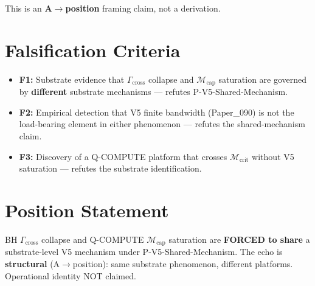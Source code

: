\documentclass[11pt,a4paper]{article}
\begin{document}
This is an \textbf{A$\to$position} framing claim, not a derivation.

\section{Falsification Criteria}

\begin{itemize}[noitemsep]
\item \textbf{F1:} Substrate evidence that $\Gamma_\mathrm{cross}$ collapse and $\mathcal{M}_\mathrm{cap}$ saturation are governed by \textbf{different} substrate mechanisms --- refutes P-V5-Shared-Mechanism.
\item \textbf{F2:} Empirical detection that V5 finite bandwidth (Paper\_090) is not the load-bearing element in either phenomenon --- refutes the shared-mechanism claim.
\item \textbf{F3:} Discovery of a Q-COMPUTE platform that crosses $\mathcal{M}_\mathrm{crit}$ without V5 saturation --- refutes the substrate identification.
\end{itemize}

\section{Position Statement}

BH $\Gamma_\mathrm{cross}$ collapse and Q-COMPUTE $\mathcal{M}_\mathrm{cap}$ saturation are \textbf{FORCED to share} a substrate-level V5 mechanism under P-V5-Shared-Mechanism. The echo is \textbf{structural} (A$\to$position): same substrate phenomenon, different platforms. Operational identity NOT claimed.
\end{document}
